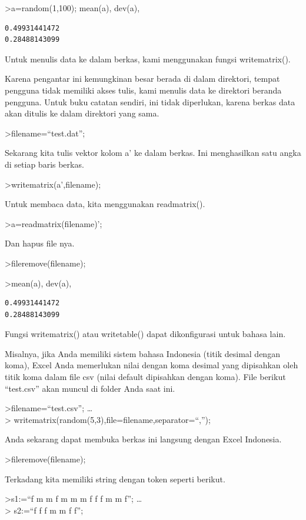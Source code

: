 \documentclass[
]{book}
\begin{document}
\textgreater a=random(1,100); mean(a), dev(a),

\begin{verbatim}
0.49931441472
0.28488143099
\end{verbatim}

Untuk menulis data ke dalam berkas, kami menggunakan fungsi writematrix().

Karena pengantar ini kemungkinan besar berada di dalam direktori, tempat pengguna tidak memiliki akses tulis, kami menulis data ke direktori beranda pengguna. Untuk buku catatan sendiri, ini tidak diperlukan, karena berkas data akan ditulis ke dalam direktori yang sama.

\textgreater filename=``test.dat'';

Sekarang kita tulis vektor kolom a' ke dalam berkas. Ini menghasilkan satu angka di setiap baris berkas.

\textgreater writematrix(a',filename);

Untuk membaca data, kita menggunakan readmatrix().

\textgreater a=readmatrix(filename)';

Dan hapus file nya.

\textgreater fileremove(filename);

\textgreater mean(a), dev(a),

\begin{verbatim}
0.49931441472
0.28488143099
\end{verbatim}

Fungsi writematrix() atau writetable() dapat dikonfigurasi untuk bahasa lain.

Misalnya, jika Anda memiliki sistem bahasa Indonesia (titik desimal dengan koma), Excel Anda memerlukan nilai dengan koma desimal yang dipisahkan oleh titik koma dalam file csv (nilai default dipisahkan dengan koma). File berikut ``test.csv'' akan muncul di folder Anda saat ini.

\textgreater filename=``test.csv''; \ldots{}\\
\textgreater{} writematrix(random(5,3),file=filename,separator=``,'');

Anda sekarang dapat membuka berkas ini langsung dengan Excel Indonesia.

\textgreater fileremove(filename);

Terkadang kita memiliki string dengan token seperti berikut.

\textgreater s1:=``f m m f m m m f f f m m f''; \ldots{}\\
\textgreater{} s2:=``f f f m m f f'';
\end{document}
